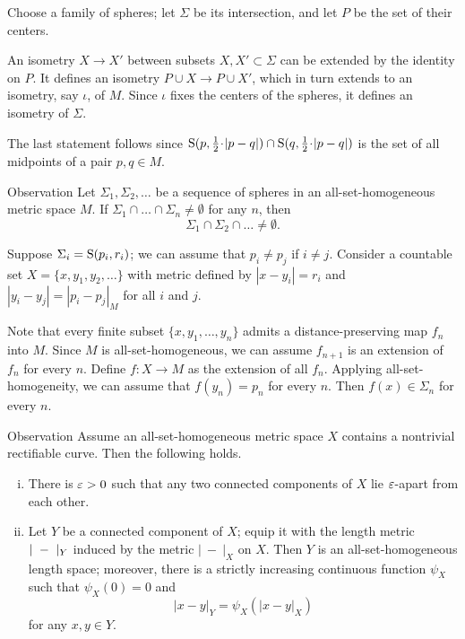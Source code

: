 \documentclass[a4paper,10pt]{article}
\begin{document}
Choose a family of spheres;
let $\Sigma$ be its intersection, and let $P$ be the set of their centers.

An isometry $X \to X'$ between subsets $X,X'\subset \Sigma$ can be extended by the identity on $P$.
It defines an isometry $P\cup X\to P\cup X'$,
which in turn extends to an isometry, say $\iota$, of $M$.
Since $\iota$ fixes the centers of the spheres, it defines an isometry of $\Sigma$.

The last statement follows since $\Sph(p,\tfrac12\cdot|p-q|)\cap \Sph(q,\tfrac12\cdot|p-q|)$ is the set of all midpoints of a pair $p,q\in M$.
\qeds

\begin{thm}{Observation}\label{obs:FIP}
Let $\Sigma_1,\Sigma_2,\dots$ be a sequence of spheres in an all-set-homogeneous metric space $M$.
If $\Sigma_1\cap\ldots\cap\Sigma_n\ne\emptyset$ for any $n$, then
\[
\Sigma_1\cap\Sigma_2\cap\ldots\ne\emptyset.
\]

\end{thm}

Suppose $\Sigma_i=\mathrm{S}(p_i,r_i)$; we can assume that $p_i\ne p_j$ if $i\ne j$.
Consider a countable set $X=\{x,y_1,y_2,\dots\}$ with metric defined by $|x-y_i|=r_i$ and $|y_i-y_j|=|p_i-p_j|_M$ for all $i$ and $j$.

Note that every finite subset $\{x,y_1,\ldots,y_n\}$ admits a distance-preserving map $f_n$ into $M$.
Since $M$ is all-set-homogeneous, we can assume $f_{n+1}$ is an extension of $f_n$ for every $n$.
Define $f\colon X\to M$ as the extension of all $f_n$.
Applying all-set-homogeneity, we can assume that $f(y_n)=p_n$ for every $n$.
Then $f(x)\in \Sigma_n$ for every $n$.
\qeds

\begin{thm}{Observation}\label{lem:length-sphere}
Assume an all-set-homogeneous metric space $X$ contains a nontrivial rectifiable curve. Then the following holds.
\begin{enumerate}[(i)]
\item There is $\varepsilon>0$ such that any two connected components of $X$ lie $\varepsilon$-apart from each other.
\item Let $Y$ be a connected component of $X$; equip it with the length metric $|\ \z-\ |_Y$ induced by the metric $|\ -\ |_X$ on $X$.
Then $Y$ is an all-set-homogeneous length space; moreover, there is a strictly increasing continuous function $\psi_X$ such that $\psi_X(0)=0$ and
\[|x-y|_Y=\psi_X(|x-y|_X)\]
for any $x,y\in Y$.
\end{enumerate}

\end{thm}
\end{document}
